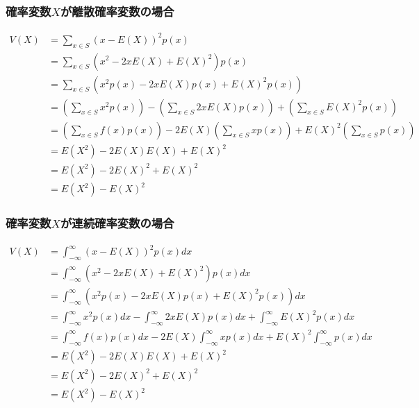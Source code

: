 \documentclass[dvipdfmx]{jsarticle}
\begin{document}
 \subsubsection{確率変数$X$が離散確率変数の場合}
 \begin{align}
  V\left(X\right)&=\sum_{x\in S}\left(x-E\left(X\right)\right)^2p\left(x\right)\nonumber\\
  &=\sum_{x\in S}\left(x^2-2xE\left(X\right)+E\left(X\right)^2\right)p\left(x\right)\nonumber\\
  &=\sum_{x\in S}\left(x^2p\left(x\right)-2xE\left(X\right)p\left(x\right)+E\left(X\right)^2p\left(x\right)\right)\nonumber\\
  &=\left(\sum_{x\in S}x^2p\left(x\right)\right)-\left(\sum_{x\in S}2xE\left(X\right)p\left(x\right)\right)+\left(\sum_{x\in S}E\left(X\right)^2p\left(x\right)\right)\nonumber\\
  &=\left(\sum_{x\in S}f\left(x\right)p\left(x\right)\right)-2E\left(X\right)\left(\sum_{x\in S}xp\left(x\right)\right)+E\left(X\right)^2\left(\sum_{x\in S}p\left(x\right)\right)\nonumber\\
  &=E\left(X^2\right)-2E\left(X\right)E\left(X\right)+E\left(X\right)^2\nonumber\\
  &=E\left(X^2\right)-2E\left(X\right)^2+E\left(X\right)^2\nonumber\\
  &=E\left(X^2\right)-E\left(X\right)^2
 \end{align}
 \subsubsection{確率変数$X$が連続確率変数の場合}
 \begin{align}
  V\left(X\right)&=\int_{-\infty}^\infty\left(x-E\left(X\right)\right)^2p\left(x\right)dx\nonumber\\
  &=\int_{-\infty}^\infty\left(x^2-2xE\left(X\right)+E\left(X\right)^2\right)p\left(x\right)dx\nonumber\\
  &=\int_{-\infty}^\infty\left(x^2p\left(x\right)-2xE\left(X\right)p\left(x\right)+E\left(X\right)^2p\left(x\right)\right)dx\nonumber\\
  &=\int_{-\infty}^\infty x^2p\left(x\right)dx-\int_{-\infty}^\infty 2xE\left(X\right)p\left(x\right)dx+\int_{-\infty}^\infty E\left(X\right)^2p\left(x\right)dx\nonumber\\
  &=\int_{-\infty}^\infty f\left(x\right)p\left(x\right)dx-2E\left(X\right)\int_{-\infty}^\infty xp\left(x\right)dx+E\left(X\right)^2\int_{-\infty}^\infty p\left(x\right)dx\nonumber\\
  &=E\left(X^2\right)-2E\left(X\right)E\left(X\right)+E\left(X\right)^2\nonumber\\
  &=E\left(X^2\right)-2E\left(X\right)^2+E\left(X\right)^2\nonumber\\
  &=E\left(X^2\right)-E\left(X\right)^2
 \end{align}
\end{document}
